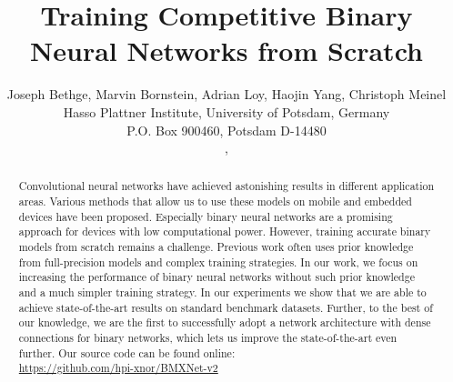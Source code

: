 \documentclass[10pt,twocolumn,letterpaper]{article}
\begin{document}
\title{Training Competitive Binary Neural Networks from Scratch}

\author{Joseph Bethge\footnotemark[1] , Marvin Bornstein\footnotemark[2] , Adrian Loy\footnotemark[2] , Haojin Yang\footnotemark[1] , Christoph Meinel\footnotemark[1]  \\
Hasso Plattner Institute, University of Potsdam, Germany\\
P.O. Box 900460, Potsdam D-14480\\
, 
}

\maketitle

\begin{abstract}

Convolutional neural networks have achieved astonishing results in different application areas.
Various methods that allow us to use these models on mobile and embedded devices have been proposed.
Especially binary neural networks are a promising approach for devices with low computational power.
However, training accurate binary models from scratch remains a challenge.
Previous work often uses prior knowledge from full-precision models and complex training strategies.
In our work, we focus on increasing the performance of binary neural networks without such prior knowledge and a much simpler training strategy.
In our experiments we show that we are able to achieve state-of-the-art results on standard benchmark datasets.
Further, to the best of our knowledge, we are the first to successfully adopt a network architecture with dense connections for binary networks, which lets us improve the state-of-the-art even further.
Our source code can be found online: \\
\url{https://github.com/hpi-xnor/BMXNet-v2}
\end{abstract}
\end{document}
